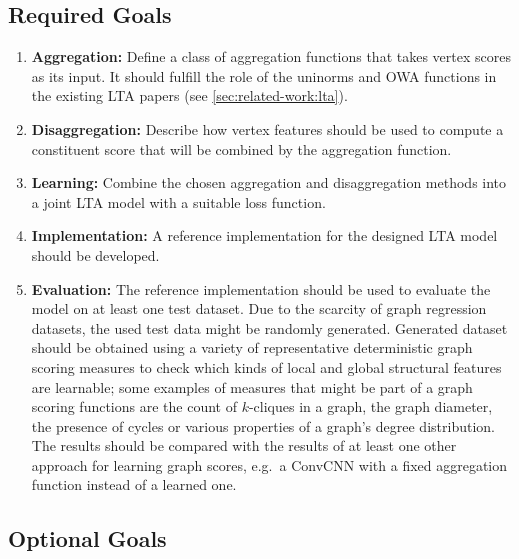 \documentclass[12pt]{scrartcl}
\begin{document}
\subsection{Required Goals}%
\label{sec:goals:req}

\begin{enumerate}[label=\textbf{\arabic*.}]
	\item \textbf{Aggregation:}
		Define a class of aggregation functions that takes vertex scores as its input.
		It should fulfill the role of the uninorms and OWA functions in the existing LTA papers (see \cref{sec:related-work:lta}).
	\item \textbf{Disaggregation:}
		Describe how vertex features should be used to compute a constituent score that will be combined by the aggregation function.
	\item \textbf{Learning:}
		Combine the chosen aggregation and disaggregation methods into a joint LTA model with a suitable loss function.
	\item \textbf{Implementation:}
		A reference implementation for the designed LTA model should be developed.
	\item \textbf{Evaluation:}
		The reference implementation should be used to evaluate the model on at least one test dataset.
		Due to the scarcity of graph regression datasets, the used test data might be randomly generated.
		Generated dataset should be obtained using a variety of representative deterministic graph scoring measures to check which kinds of local and global structural features are learnable;
		some examples of measures that might be part of a graph scoring functions are the count of $k$-cliques in a graph, the graph diameter, the presence of cycles or various properties of a graph's degree distribution.
		The results should be compared with the results of at least one other approach for learning graph scores, e.g.\ a ConvCNN with a fixed aggregation function instead of a learned one.
\end{enumerate}

\subsection{Optional Goals}%
\label{sec:goals:opt}
\end{document}
